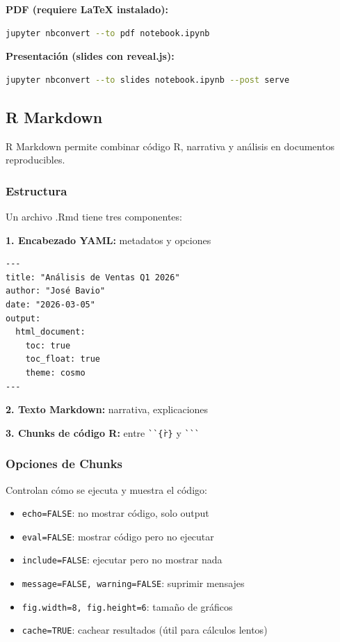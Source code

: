 \documentclass[11pt,a4paper]{article}
\begin{document}
\textbf{PDF (requiere LaTeX instalado):}
\begin{lstlisting}[language=bash]
jupyter nbconvert --to pdf notebook.ipynb
\end{lstlisting}

\textbf{Presentación (slides con reveal.js):}
\begin{lstlisting}[language=bash]
jupyter nbconvert --to slides notebook.ipynb --post serve
\end{lstlisting}

\subsection{R Markdown}

R Markdown permite combinar código R, narrativa y análisis en documentos reproducibles.

\subsubsection{Estructura}

Un archivo .Rmd tiene tres componentes:

\textbf{1. Encabezado YAML:} metadatos y opciones
\begin{lstlisting}
---
title: "Análisis de Ventas Q1 2026"
author: "José Bavio"
date: "2026-03-05"
output: 
  html_document:
    toc: true
    toc_float: true
    theme: cosmo
---
\end{lstlisting}

\textbf{2. Texto Markdown:} narrativa, explicaciones

\textbf{3. Chunks de código R:} entre \texttt{\`{}\`{}\`\{r\}} y \texttt{\`{}\`{}\`}

\subsubsection{Opciones de Chunks}

Controlan cómo se ejecuta y muestra el código:

\begin{itemize}
\item \texttt{echo=FALSE}: no mostrar código, solo output
\item \texttt{eval=FALSE}: mostrar código pero no ejecutar
\item \texttt{include=FALSE}: ejecutar pero no mostrar nada
\item \texttt{message=FALSE, warning=FALSE}: suprimir mensajes
\item \texttt{fig.width=8, fig.height=6}: tamaño de gráficos
\item \texttt{cache=TRUE}: cachear resultados (útil para cálculos lentos)
\end{itemize}
\end{document}
